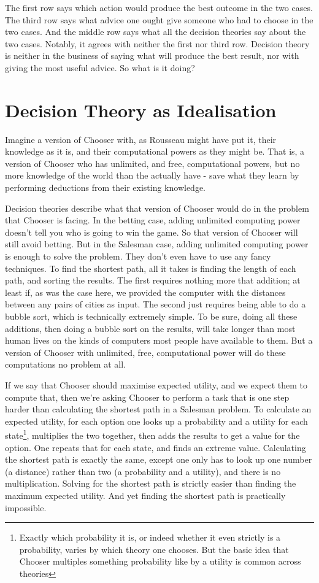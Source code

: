 \documentclass[
  12pt,
  letterpaper,
  DIV=11,
  numbers=noendperiod,
  twoside]{scrartcl}
\begin{document}
The first row says which action would produce the best outcome in the
two cases. The third row says what advice one ought give someone who had
to choose in the two cases. And the middle row says what all the
decision theories say about the two cases. Notably, it agrees with
neither the first nor third row. Decision theory is neither in the
business of saying what will produce the best result, nor with giving
the most useful advice. So what is it doing?

\section{Decision Theory as
Idealisation}\label{decision-theory-as-idealisation}

Imagine a version of Chooser with, as Rousseau might have put it, their
knowledge as it is, and their computational powers as they might be.
That is, a version of Chooser who has unlimited, and free, computational
powers, but no more knowledge of the world than the actually have - save
what they learn by performing deductions from their existing knowledge.

Decision theories describe what that version of Chooser would do in the
problem that Chooser is facing. In the betting case, adding unlimited
computing power doesn't tell you who is going to win the game. So that
version of Chooser will still avoid betting. But in the Salesman case,
adding unlimited computing power is enough to solve the problem. They
don't even have to use any fancy techniques. To find the shortest path,
all it takes is finding the length of each path, and sorting the
results. The first requires nothing more that addition; at least if, as
was the case here, we provided the computer with the distances between
any pairs of cities as input. The second just requires being able to do
a bubble sort, which is technically extremely simple. To be sure, doing
all these additions, then doing a bubble sort on the results, will take
longer than most human lives on the kinds of computers most people have
available to them. But a version of Chooser with unlimited, free,
computational power will do these computations no problem at all.

If we say that Chooser should maximise expected utility, and we expect
them to compute that, then we're asking Chooser to perform a task that
is one step harder than calculating the shortest path in a Salesman
problem. To calculate an expected utility, for each option one looks up
a probability and a utility for each state\footnote{Exactly which
  probability it is, or indeed whether it even strictly is a
  probability, varies by which theory one chooses. But the basic idea
  that Chooser multiples something probability like by a utility is
  common across theories}, multiplies the two together, then adds the
results to get a value for the option. One repeats that for each state,
and finds an extreme value. Calculating the shortest path is exactly the
same, except one only has to look up one number (a distance) rather than
two (a probability and a utility), and there is no multiplication.
Solving for the shortest path is strictly easier than finding the
maximum expected utility. And yet finding the shortest path is
practically impossible.
\end{document}
